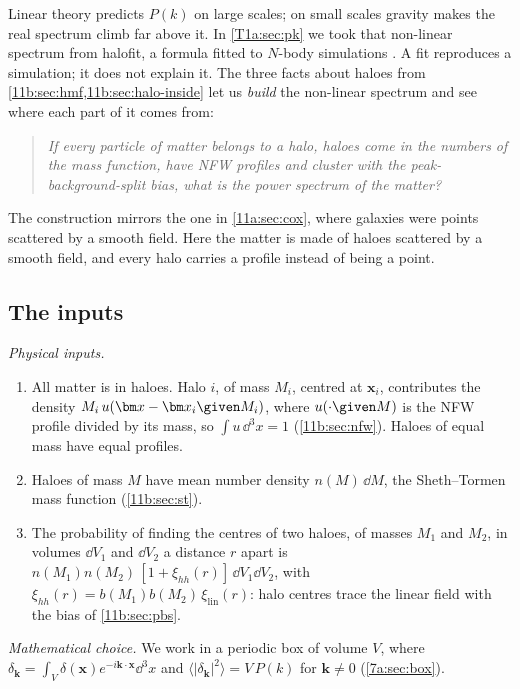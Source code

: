 Linear theory predicts $P(k)$ on large scales; on small scales gravity makes the
real spectrum climb far above it. In \cref{T1a:sec:pk} we took that non-linear
spectrum from halofit, a formula fitted to $N$-body simulations
\cite{Takahashi2012}. A fit reproduces a simulation; it does not explain it. The
three facts about haloes from \cref{11b:sec:hmf,11b:sec:halo-inside} let us
\emph{build} the non-linear spectrum and see where each part of it comes from:
\begin{quote}
\emph{If every particle of matter belongs to a halo, haloes come in the numbers of
the mass function, have NFW profiles and cluster with the peak-background-split
bias, what is the power spectrum of the matter?}
\end{quote}
The construction mirrors the one in \cref{11a:sec:cox}, where galaxies were
points scattered by a smooth field. Here the matter is made of haloes scattered by
a smooth field, and every halo carries a profile instead of being a point.

\subsection{The inputs}
\label{11b:sec:hm-inputs}

\emph{Physical inputs.}
\begin{enumerate}[label=(K\arabic*),leftmargin=2.6em,itemsep=1pt]
  \item All matter is in haloes. Halo $i$, of mass $M_i$, centred at $\bm x_i$,
        contributes the density $M_i\,u(\bm x-\bm x_i\given M_i)$, where
        $u(\cdot\given M)$ is the NFW profile divided by its mass, so
        $\int u\,\dd^3x=1$ (\cref{11b:sec:nfw}). Haloes of equal mass have equal
        profiles.
  \item Haloes of mass $M$ have mean number density $n(M)\,\dd M$, the
        Sheth--Tormen mass function (\cref{11b:sec:st}).
  \item The probability of finding the centres of two haloes, of masses $M_1$ and
        $M_2$, in volumes $\dd V_1$ and $\dd V_2$ a distance $r$ apart is
        $n(M_1)n(M_2)\,[1+\xi_{hh}(r)]\,\dd V_1\dd V_2$, with
        $\xi_{hh}(r)=b(M_1)b(M_2)\,\xi_{\mathrm{lin}}(r)$: halo centres trace the
        linear field with the bias of \cref{11b:sec:pbs}.
\end{enumerate}
\emph{Mathematical choice.} We work in a periodic box of volume $V$, where
$\delta_{\bm k}=\int_V\delta(\bm x)e^{-i\bm k\cdot\bm x}\dd^3x$ and
$\langle|\delta_{\bm k}|^2\rangle=V\,P(k)$ for $\bm k\ne0$
(\cref{7a:sec:box}).

